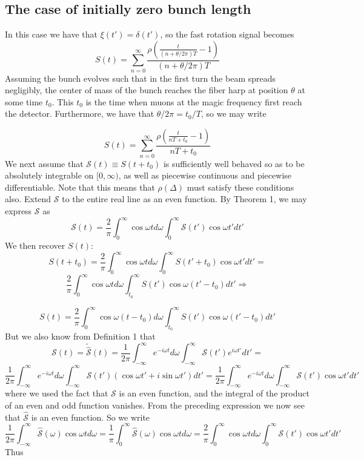 \subsection{The case of initially zero bunch length}

In this case we have that $\xi(t')=\delta(t')$, so the fast rotation signal becomes \[S(t)=\sum^{\infty}_{n=0}\frac{\rho\left(\frac{t}{(n+\theta/2\pi)T}-1\right)}{(n+\theta/2\pi)T}\]
Assuming the bunch evolves such that in the first turn the beam spreads negligibly, the center of mass of the bunch reaches the fiber harp at position $\theta$ at some time $t_0$. This $t_0$ is the time when muons at the magic frequency first reach the detector. Furthermore, we have that $\theta/2\pi=t_0/T$, so we may write 

\[
S(t)=\sum^{\infty}_{n=0}\frac{\rho\left(\frac{t}{nT+t_0}-1\right)}{nT+t_0}
\]
We next assume that $\mathcal{S}(t)\equiv S(t+t_0)$ is sufficiently well behaved so as to be absolutely integrable on $[0,\infty)$, as well as piecewise continuous and piecewise differentiable. Note that this means that $\rho(\Delta)$ must satisfy these conditions also. Extend $\mathcal{S}$ to the entire real line as an even function. By Theorem 1, we may express $\mathcal{S}$ as \[\mathcal{S}(t)=\frac{2}{\pi}\int^{\infty}_0\cos\omega td\omega\int^{\infty}_0\mathcal{S}(t')\cos\omega t'dt'\] We then recover $S(t)$:\[S(t+t_0)=\frac{2}{\pi}\int^{\infty}_0\cos\omega td\omega\int^{\infty}_0S(t'+t_0)\cos\omega t'dt'=\]\[\frac{2}{\pi}\int^{\infty}_0\cos\omega td\omega\int^{\infty}_{t_0}S(t')\cos\omega(t'-t_0)dt'\Rightarrow\]

\[
S(t)=\frac{2}{\pi}\int^{\infty}_0\cos\omega(t-t_0)d\omega\int^{\infty}_{t_0}S(t')\cos\omega(t'-t_0)dt'
\] 
But we also know from Definition 1 that \[\mathcal{S}(t)=\tilde{\hat{\mathcal{S}}}(t)=\frac{1}{2\pi}\int^{\infty}_{-\infty}e^{-i\omega t}d\omega\int^{\infty}_{-\infty}\mathcal{S}(t')e^{i\omega t'}dt'=\]\[\frac{1}{2\pi}\int^{\infty}_{-\infty}e^{-i\omega t}d\omega\int^{\infty}_{-\infty}\mathcal{S}(t')(\cos\omega t'+i\sin\omega t')dt'=\frac{1}{2\pi}\int^{\infty}_{-\infty}e^{-i\omega t}d\omega\int^{\infty}_{-\infty}\mathcal{S}(t')\cos\omega t'dt'\] where we used the fact that $\mathcal{S}$ is an even function, and the integral of the product of an even and odd function vanishes. From the preceding expression we now see that $\hat{\mathcal{S}}$ is an even function. So we write \[\frac{1}{2\pi}\int^{\infty}_{-\infty}\hat{\mathcal{S}}(\omega)\cos\omega td\omega=\frac{1}{\pi}\int^{\infty}_0\hat{\mathcal{S}}(\omega)\cos\omega td\omega=\frac{2}{\pi}\int^{\infty}_0\cos\omega td\omega\int^{\infty}_0\mathcal{S}(t')\cos\omega t'dt'\] Thus 

